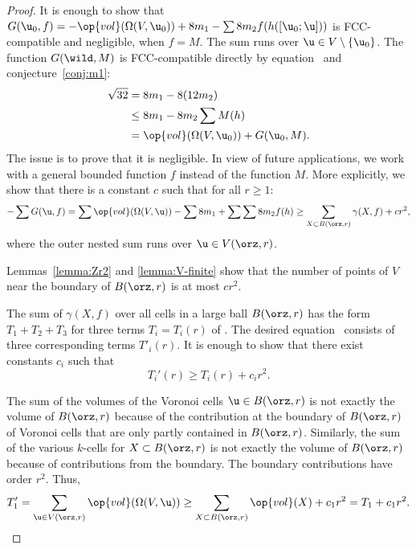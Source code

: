\begin{proof} 
It is enough to show that $G( \u_0,f) = -\op{vol}(\Omega(V, \u_0)) + 8
m_1 - \sum 8 m_2 f(h([\u_0;\u]))$ is FCC-compatible and negligible, when $f=M$.
The sum runs over $\u\in V\setminus\{\u_0\}$.
The function $G(\wild,M)$ is FCC-compatible directly
by equation~
and conjecture~\ref{conj:m1}:
%
%
\begin{align*} 
\sqrt{32} &= 8 m_1 - 8 (12 m_2)\\
&\le 8 m_1 - 8 m_2 \sum M(h)\\
&= \op{vol}(\Omega(V, \u_0)) + G( \u_0,M).
\end{align*}
The issue is to prove that it is negligible.  In view of future applications, 
we work with a general bounded function $f$ instead
of the function $M$.   More explicitly, we show that there is a
constant $c$ such that for all $r\ge 1$:%
\begin{equation}\label{eqn:neg} 
-\sum G( \u,f) = \sum \op{vol}(\Omega(V, \u)) 
-\sum 8m_1 + \sum \sum 8 m_2 f(h) \ge \sum_{X\subset B(\orz,r)} \gamma(X,f)  + c r^2,
\end{equation}
where the outer nested sum runs over $ \u\in  V(\orz,r)$.  

Lemmas~\ref{lemma:Zr2} and \ref{lemma:V-finite} show that the number
of points of $ V$ near the boundary of $B(\orz,r)$ is at most $c r^2$.


The sum of $\gamma(X,f)$ over all cells in a large ball
$B(\orz,r)$ has the form $T_1 + T_2 + T_3$ for
three terms $T_i = T_i(r)$ of .  The desired
equation~ consists of three corresponding terms
$T'_i(r)$.  It is enough to show that there exist constants $c_i$ such that
\[  
T_i'(r) \ge T_i(r) + c_i r^2.
\] 

The sum of the volumes of the Voronoi cells $ \u\in B(\orz,r)$ is not
exactly the volume of $B(\orz,r)$ because of the contribution at the
boundary of $B(\orz,r)$ of Voronoi cells that are only partly contained
in $B(\orz,r)$.  Similarly, the sum of the various $k$-cells for
$X\subset B(\orz,r)$ is not exactly the volume of $B(\orz,r)$ because of
contributions from the boundary. The boundary contributions have order
$r^2$. Thus,
\[  
T_1'= \sum_{ \u\in  V(\orz,r)} \op{vol}(\Omega(V, \u)) 
\ge \sum_{X\subset B(\orz,r)} \op{vol}(X) + c_1 r^2 = T_1 + c_1 r^2.
\] 



\end{proof}
